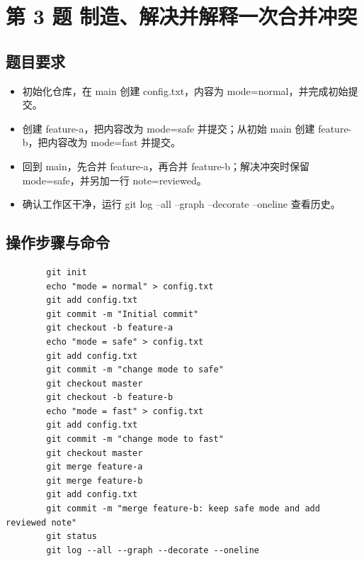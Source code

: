 \documentclass{article}
\begin{document}
  \newpage    
  \section{第 3 题 制造、解决并解释一次合并冲突}
    \subsection*{题目要求}
      \begin{itemize}
        \item 初始化仓库，在 main 创建 config.txt，内容为 mode=normal，并完成初始提交。
        \item 创建 feature-a，把内容改为 mode=safe 并提交；从初始 main 创建 feature-b，把内容改为 mode=fast 并提交。
        \item 回到 main，先合并 feature-a，再合并 feature-b；解决冲突时保留 mode=safe，并另加一行 note=reviewed。
        \item 确认工作区干净，运行 git log --all --graph --decorate --oneline 查看历史。
      \end{itemize}
    \subsection*{操作步骤与命令}
      \begin{verbatim}
        git init
        echo "mode = normal" > config.txt
        git add config.txt
        git commit -m "Initial commit"
        git checkout -b feature-a
        echo "mode = safe" > config.txt
        git add config.txt
        git commit -m "change mode to safe"
        git checkout master
        git checkout -b feature-b
        echo "mode = fast" > config.txt
        git add config.txt
        git commit -m "change mode to fast"
        git checkout master
        git merge feature-a
        git merge feature-b
        git add config.txt
        git commit -m "merge feature-b: keep safe mode and add reviewed note"
        git status
        git log --all --graph --decorate --oneline
      \end{verbatim}
\end{document}
